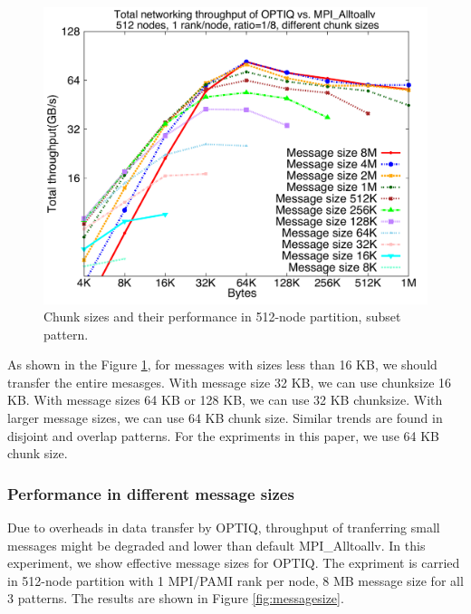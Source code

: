\begin{figure}[!htb]
\vspace{-0.1in}
\centering
\includegraphics[scale=0.30]{figures/87_chunksize.pdf}
\vspace{-0.1in}
\caption{Chunk sizes and their performance in 512-node partition, subset pattern.}
\vspace{-0.1in}
\label{fig:chunksize}
\end{figure}

As shown in the Figure \ref{fig:chunksize}, for messages with sizes less than 16 KB, we should transfer the entire mesasges. With message size 32 KB, we can use chunksize 16 KB. With message sizes 64 KB or 128 KB, we can use 32 KB chunksize. With larger message sizes, we can use 64 KB chunk size. Similar trends are found in disjoint and overlap patterns. For the expriments in this paper, we use 64 KB chunk size. 

\subsubsection{Performance in different message sizes}

Due to overheads in data transfer by OPTIQ, throughput of tranferring small messages might be degraded and lower than default MPI\_Alltoallv. In this experiment, we show effective message sizes for OPTIQ. The expriment is carried in 512-node partition with 1 MPI/PAMI rank per node, 8 MB message size for all 3 patterns. The results are shown in Figure \ref{fig:messagesize}.

